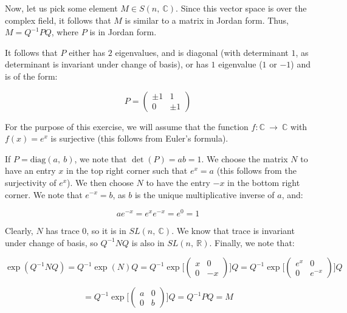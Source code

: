 \documentclass[10pt, oneside]{article}
\begin{document}
    Now, let us pick some element $M \in S(n, \ \mathbb{C})$. Since this vector space is over the complex field, it follows that $M$ is similar to a matrix in Jordan form. Thus,
    $M = Q^{-1} P Q$, where $P$ is in Jordan form.
    \newline

    It follows that $P$ either has $2$ eigenvalues, and is diagonal (with determinant $1$, as determinant is invariant under change of basis), or has $1$ eigenvalue ($1$ or $-1$) and is of the form:

    \begin{equation}
      P = \begin{pmatrix} \pm 1 & 1 \\ 0 & \pm 1 \end{pmatrix}
      \end{equation}

    For the purpose of this exercise, we will assume that the function $f : \mathbb{C} \ \rightarrow \ \mathbb{C}$ with $f(x) = e^x$ is surjective (this follows from
    Euler's formula).
    \newline

    If $P = \text{diag}(a, \ b)$, we note that $\det(P) = ab = 1$. We choose the matrix $N$ to have an entry $x$ in the top right corner such that $e^x = a$ (this follows from the
    surjectivity of $e^x$). We then choose $N$ to have the entry $-x$ in the bottom right corner. We note that $e^{-x} = b$, as $b$ is the unique multiplicative inverse of $a$, and:

    $$a e^{-x} = e^{x} e^{-x} = e^{0} = 1$$

    Clearly, $N$ has trace $0$, so it is in $SL(n, \ \mathbb{C})$. We know that trace is invariant under change of basis, so $Q^{-1} N Q$ is also in $SL(n, \ \mathbb{R})$. Finally, we
    note that:

    $$\exp(Q^{-1} N Q) = Q^{-1} \exp(N) Q = Q^{-1} \exp \Big[ \begin{pmatrix} x & 0 \\ 0 & -x \end{pmatrix} \Big] Q = Q^{-1} \exp \Big[ \begin{pmatrix} e^x & 0 \\ 0 & e^{-x} \end{pmatrix} \Big] Q$$

    $$ = Q^{-1} \exp \Big[ \begin{pmatrix} a & 0 \\ 0 & b \end{pmatrix} \Big] Q = Q^{-1} P Q = M$$
\end{document}
